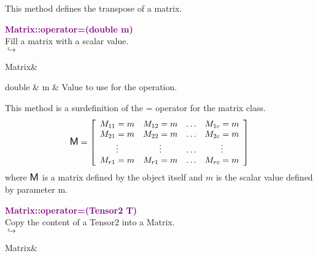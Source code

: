This method defines the transpose of a matrix.

\textcolor{purple}{\textbf{Matrix::operator=(double m)}}\label{Matrix::operator=(double m)}\\
Fill a matrix with a scalar value.\\ \hspace*{5mm}$\hookrightarrow$
\vspace*{-2em}\begin{tcolorbox}[grow to left by=-1cm, width=\textwidth-1cm,myArgs,tabularx={l|R}]
Matrix&
\end{tcolorbox}

\begin{tcolorbox}[width=\textwidth,myArgs,tabularx={ll|R}]
double & m & Value to use for the operation.
\end{tcolorbox}

This method is a surdefinition of the = operator for the matrix class.
\begin{equation*}
\mbox{\large\ensuremath{\mathsf{M}}}=\left[\begin{array}{cccc}
  M_{11}=m & M_{12}=m & \hdots & M_{1c}=m\\
  M_{21}=m & M_{22}=m & \hdots & M_{2c}=m\\
  \vdots & \vdots & \hdots & \vdots\\
  M_{r1}=m & M_{r1}=m & \hdots & M_{rc}=m
  \end{array}\right]
\end{equation*}
where $\mbox{\large\ensuremath{\mathsf{M}}}$ is a matrix defined by the object itself and $m$ is the scalar value defined by parameter m.

\textcolor{purple}{\textbf{Matrix::operator=(Tensor2 T)}}\label{Matrix::operator=(Tensor2 T)}\\
Copy the content of a Tensor2 into a Matrix.\\ \hspace*{5mm}$\hookrightarrow$
\vspace*{-2em}\begin{tcolorbox}[grow to left by=-1cm, width=\textwidth-1cm,myArgs,tabularx={l|R}]
Matrix&
\end{tcolorbox}

